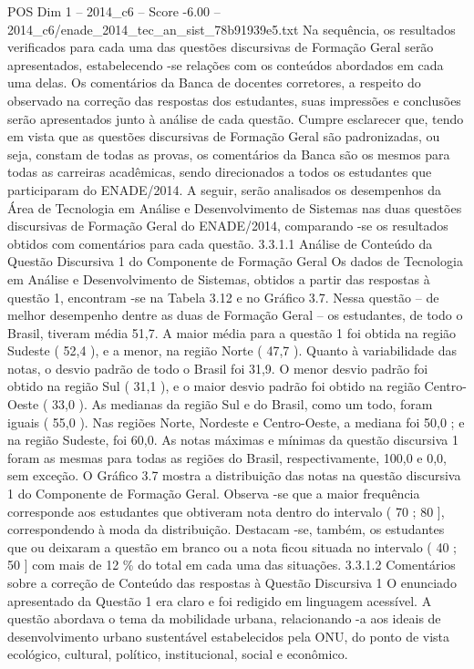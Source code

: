 \begin{textsample}{POS Dim 1 – 2014\_c6 – Score -6.00 – 2014\_c6/enade\_2014\_tec\_an\_sist\_78b91939e5.txt}
Na sequência, os resultados verificados para cada uma das questões discursivas de Formação Geral serão apresentados, estabelecendo -se relações com os conteúdos abordados em cada uma delas.
Os comentários da Banca de docentes corretores, a respeito do observado na correção das respostas dos estudantes, suas impressões e conclusões serão apresentados junto à análise de cada questão.
Cumpre esclarecer que, tendo em vista que as questões discursivas de Formação Geral são padronizadas, ou seja, constam de todas as provas, os comentários da Banca são os mesmos para todas as carreiras acadêmicas, sendo direcionados a todos os estudantes que participaram do ENADE/2014.
A seguir, serão analisados os desempenhos da Área de Tecnologia em Análise e Desenvolvimento de Sistemas nas duas questões discursivas de Formação Geral do ENADE/2014, comparando -se os resultados obtidos com comentários para cada questão. 3.3.1.1 Análise de Conteúdo da Questão Discursiva 1 do Componente de Formação Geral Os dados de Tecnologia em Análise e Desenvolvimento de Sistemas, obtidos a partir das respostas à questão 1, encontram -se na Tabela 3.12 e no Gráfico 3.7.
Nessa questão – de melhor desempenho dentre as duas de Formação Geral – os estudantes, de todo o Brasil, tiveram média 51,7.
A maior média para a questão 1 foi obtida na região Sudeste ( 52,4 ), e a menor, na região Norte ( 47,7 ).
Quanto à variabilidade das notas, o desvio padrão de todo o Brasil foi 31,9.
O menor desvio padrão foi obtido na região Sul ( 31,1 ), e o maior desvio padrão foi obtido na região Centro-Oeste ( 33,0 ).
As medianas da região Sul e do Brasil, como um todo, foram iguais ( 55,0 ).
Nas regiões Norte, Nordeste e Centro-Oeste, a mediana foi 50,0 ; e na região Sudeste, foi 60,0.
As notas máximas e mínimas da questão discursiva 1 foram as mesmas para todas as regiões do Brasil, respectivamente, 100,0 e 0,0, sem exceção.
O Gráfico 3.7 mostra a distribuição das notas na questão discursiva 1 do Componente de Formação Geral.
Observa -se que a maior frequência corresponde aos estudantes que obtiveram nota dentro do intervalo ( 70 ; 80 ], correspondendo à moda da distribuição.
Destacam -se, também, os estudantes que ou deixaram a questão em branco ou a nota ficou situada no intervalo ( 40 ; 50 ] com mais de 12 \% do total em cada uma das situações. 3.3.1.2 Comentários sobre a correção de Conteúdo das respostas à Questão Discursiva 1 O enunciado apresentado da Questão 1 era claro e foi redigido em linguagem acessível.
A questão abordava o tema da mobilidade urbana, relacionando -a aos ideais de desenvolvimento urbano sustentável estabelecidos pela ONU, do ponto de vista ecológico, cultural, político, institucional, social e econômico.

\end{textsample}
